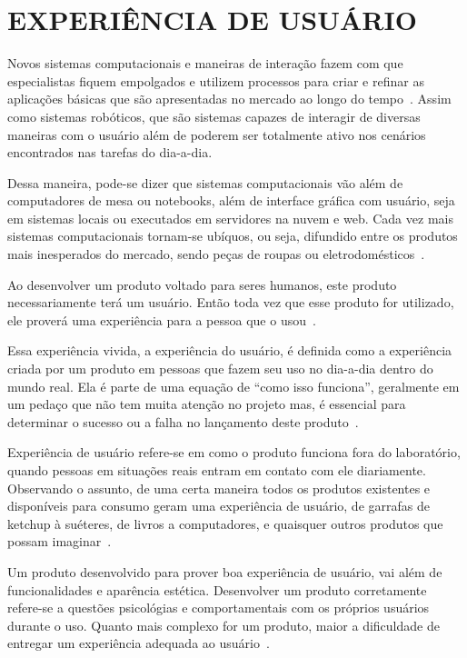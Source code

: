\chapter{EXPERIÊNCIA DE USUÁRIO}
\label{cap:ux}
Novos sistemas computacionais e maneiras de interação fazem com que especialistas fiquem empolgados e utilizem processos para criar e refinar as aplicações básicas que são apresentadas no mercado ao longo do tempo~\cite{hartson:2012}. Assim como sistemas robóticos, que são sistemas capazes de interagir de diversas maneiras com o usuário além de poderem ser totalmente ativo nos cenários encontrados nas tarefas do dia-a-dia.

Dessa maneira, pode-se dizer que sistemas computacionais vão além de computadores de mesa ou notebooks, além de interface gráfica com usuário, seja em sistemas locais ou executados em servidores na nuvem e web. Cada vez mais sistemas computacionais tornam-se ubíquos, ou seja, difundido entre os produtos mais inesperados do mercado, sendo peças de roupas ou eletrodomésticos~\cite{hartson:2012}.

Ao desenvolver um produto voltado para seres humanos, este produto necessariamente terá um usuário. Então toda vez que esse produto for utilizado, ele proverá uma experiência para a pessoa que o usou~\cite{garrett:2010}.

Essa experiência vivida, a experiência do usuário, é definida como a experiência criada por um produto em pessoas que fazem seu uso no dia-a-dia dentro do mundo real. Ela é parte de uma equação de ``como isso funciona'', geralmente em um pedaço que não tem muita atenção no projeto mas, é essencial para determinar o sucesso ou a falha no lançamento deste produto~\cite{garrett:2010}.

Experiência de usuário refere-se em como o produto funciona fora do laboratório, quando pessoas em situações reais entram em contato com ele diariamente. Observando o assunto, de uma certa maneira todos os produtos existentes e disponíveis para consumo geram uma experiência de usuário, de garrafas de ketchup à suéteres, de livros a computadores, e quaisquer outros produtos que possam imaginar~\cite{garrett:2010}.

Um produto desenvolvido para prover boa experiência de usuário, vai além de funcionalidades e aparência estética. Desenvolver um produto corretamente refere-se a questões psicológias e comportamentais com os próprios usuários durante o uso. Quanto mais complexo for um produto, maior a dificuldade de entregar um experiência adequada ao usuário~\cite{garrett:2010}.

